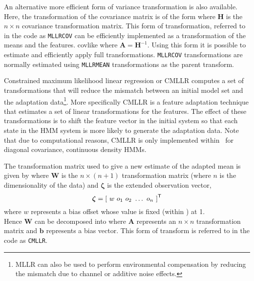 An alternative more efficient form of variance transformation is also available.
Here, the transformation of the covariance matrix is  of the form
where $\bm{H}$ is the $n\times n$ covariance transformation matrix.
This form of transformation, referred to in the code as {\tt MLLRCOV}
can be efficiently implemented as a transformation of the means and 
the features.
 {covlike}
where $\bm{A}=\bm{H}^{-1}$.
Using this form it is possible to estimate and efficiently apply full transformations.
{\tt MLLRCOV} transformations are normally estimated using {\tt MLLRMEAN} transformations
as the parent transform.


Constrained maximum likelihood linear regression or CMLLR
computes a set of transformations that will reduce the mismatch
between an initial model set and the adaptation data\footnote{
MLLR can also be used to perform environmental compensation by
reducing the mismatch due to channel or additive noise effects.}.
More specifically CMLLR is a feature adaptation technique
that estimates a set of linear transformations for the features. 
The effect of these transformations is to shift the
feature vector in the initial system 
so that each state in the HMM system is more likely to generate the 
adaptation data.
Note that due to computational reasons, CMLLR is only implemented
within \HTK\ for diagonal covariance, continuous density
HMMs.

The transformation matrix used to give a new estimate of the adapted mean is
given by
where $\bm{W}$ is the $n \times \left( n + 1 \right)$
transformation matrix (where $n$ is the dimensionality of the data)
and $\bm{\zeta}$ is the extended observation vector,
\[
        {\mbox{\boldmath $\zeta$}} = \left[\mbox{ }w\mbox{ }o_1\mbox{ }o_2\mbox{ }\dots\mbox{ }o_n\mbox{ }\right]^{\scriptstyle\sf T}
\]
where $w$ represents a bias offset whose value is fixed (within \HTK) at 1.\\
Hence $\bm{W}$ can be decomposed into
where $\bm{A}$ represents an $n \times n$
transformation matrix and $\bm{b}$ represents a bias vector.
This form of transform is referred to in the code as {\tt CMLLR}.

